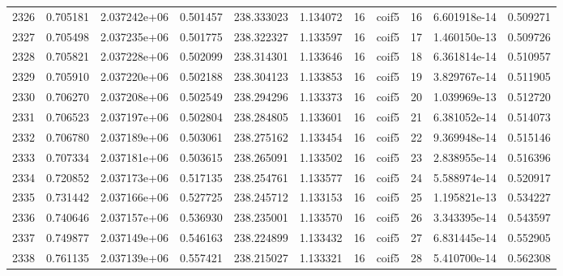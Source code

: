 \begin{tabular}{lrrrrrrlrrr}
2326 &    0.705181 &        2.037242e+06 &  0.501457 &              238.333023 &    1.134072 &      16 &        coif5 &     16 &   6.601918e-14 &      0.509271 \\
2327 &    0.705498 &        2.037235e+06 &  0.501775 &              238.322327 &    1.133597 &      16 &        coif5 &     17 &   1.460150e-13 &      0.509726 \\
2328 &    0.705821 &        2.037228e+06 &  0.502099 &              238.314301 &    1.133646 &      16 &        coif5 &     18 &   6.361814e-14 &      0.510957 \\
2329 &    0.705910 &        2.037220e+06 &  0.502188 &              238.304123 &    1.133853 &      16 &        coif5 &     19 &   3.829767e-14 &      0.511905 \\
2330 &    0.706270 &        2.037208e+06 &  0.502549 &              238.294296 &    1.133373 &      16 &        coif5 &     20 &   1.039969e-13 &      0.512720 \\
2331 &    0.706523 &        2.037197e+06 &  0.502804 &              238.284805 &    1.133601 &      16 &        coif5 &     21 &   6.381052e-14 &      0.514073 \\
2332 &    0.706780 &        2.037189e+06 &  0.503061 &              238.275162 &    1.133454 &      16 &        coif5 &     22 &   9.369948e-14 &      0.515146 \\
2333 &    0.707334 &        2.037181e+06 &  0.503615 &              238.265091 &    1.133502 &      16 &        coif5 &     23 &   2.838955e-14 &      0.516396 \\
2334 &    0.720852 &        2.037173e+06 &  0.517135 &              238.254761 &    1.133577 &      16 &        coif5 &     24 &   5.588974e-14 &      0.520917 \\
2335 &    0.731442 &        2.037166e+06 &  0.527725 &              238.245712 &    1.133153 &      16 &        coif5 &     25 &   1.195821e-13 &      0.534227 \\
2336 &    0.740646 &        2.037157e+06 &  0.536930 &              238.235001 &    1.133570 &      16 &        coif5 &     26 &   3.343395e-14 &      0.543597 \\
2337 &    0.749877 &        2.037149e+06 &  0.546163 &              238.224899 &    1.133432 &      16 &        coif5 &     27 &   6.831445e-14 &      0.552905 \\
2338 &    0.761135 &        2.037139e+06 &  0.557421 &              238.215027 &    1.133321 &      16 &        coif5 &     28 &   5.410700e-14 &      0.562308 \\

\end{tabular}
